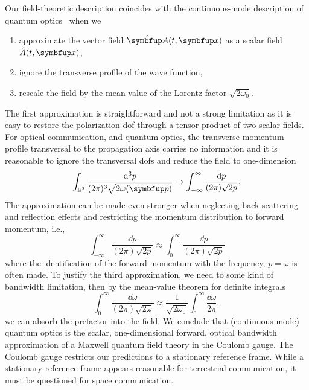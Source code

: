 Our field-theoretic description coincides with the continuous-mode description of quantum optics~\cite{Barnett2002,Loudon2000,Vogel2006,Shapiro2009} when we
\begin{enumerate}
	\item approximate the vector field $\vu{A}(t,\vb{x})$ as a scalar field $\hat{A}(t,\vb{x})$,
	\item ignore the transverse profile of the wave function,
	\item rescale the field by the mean-value of the Lorentz factor $\sqrt{2\omega_0}$.
\end{enumerate}
The first approximation is straightforward and not a strong limitation as it is easy to restore the polarization \gls{dof} through a tensor product of two scalar fields.
For optical communication, and quantum optics, the transverse momentum profile transversal to the propagation axis carries no information and it is reasonable to ignore the transversal \glspl{dof} and reduce the field to one-dimension~\cite[p.~53]{Cohen2019}
\begin{equation}
	\int_{\mathbb{R}^3}
	\frac{\dd[3]{p}}{(2\pi)^3\sqrt{2\omega(\vb{p})}}
	\to
	\int_{-\infty}^{\infty}
	\frac{\dd{p}}{(2\pi)\sqrt{2p}}
	.
\end{equation}
The approximation can be made even stronger when neglecting back-scattering and reflection effects and restricting the momentum distribution to forward momentum, i.e.,
\begin{equation}
	\int_{-\infty}^{\infty}
	\frac{\dd{p}}{(2\pi)\sqrt{2p}}
	\approx	
	\int_{0}^{\infty}
	\frac{\dd{p}}{(2\pi)\sqrt{2p}}	
\end{equation}
where the identification of the forward momentum with the frequency, $p=\omega$ is often made.
To justify the third approximation, we need to some kind of bandwidth limitation, then by the mean-value theorem for definite integrals
\begin{equation}
	\int_{0}^{\infty}
	\frac{\dd{\omega}}{(2\pi)\sqrt{2\omega}}
	\approx
	\frac{1}{\sqrt{2\omega_0}}
	\int_{0}^{\infty}
	\frac{\dd{\omega}}{2\pi}
	,
\end{equation}
we can absorb the prefactor into the field.
We conclude that (continuous-mode) quantum optics is the scalar, one-dimensional forward, optical bandwidth approximation of a Maxwell quantum field theory in the Coulomb gauge.
The Coulomb gauge restricts our predictions to a stationary reference frame.
While a stationary reference frame appears reasonable for terrestrial communication, it must be questioned for space communication.

